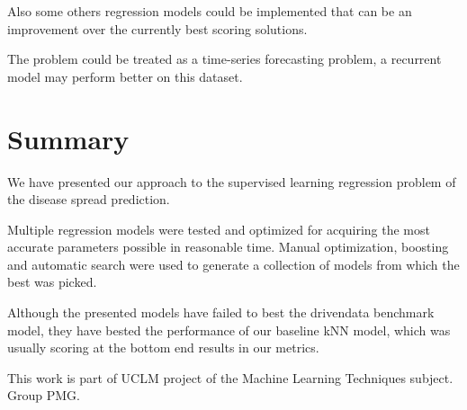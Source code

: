 \documentclass[sigconf]{acmart}
\begin{document}
Also some others regression models could be implemented that can be an improvement over the currently best scoring solutions.

The problem could be treated as a time-series forecasting problem, a recurrent model may perform better on this dataset.

\section{Summary}
We have presented our approach to the supervised learning regression problem of the disease spread prediction.

Multiple regression models were tested and optimized for acquiring the most accurate parameters possible in reasonable time.
Manual optimization, boosting and automatic search were used to generate a collection of models from which the best was picked.

Although the presented models have failed to best the drivendata benchmark model, they have bested the performance of our baseline kNN model, which was usually scoring at the bottom end results in our metrics.

%
%

\begin{acks}
This work is part of UCLM project of the Machine Learning Techniques subject. Group PMG.
\end{acks}

%
%
\end{document}
